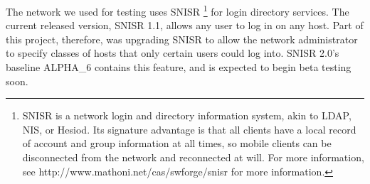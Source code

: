 The network we used for testing uses SNISR 
%
\footnote{ SNISR is a network login and directory information system, akin to
LDAP, NIS, or Hesiod.  Its signature advantage is that all clients have a
local record of account and group information at all times, so mobile clients
can be disconnected from the network and reconnected at will.  For more
information, see http://www.mathoni.net/cas/swforge/snisr for more
information. }
%
for login directory services.  
%
The current released version, SNISR 1.1, allows any user to log in on any host.  
%
Part of this project, therefore, was upgrading SNISR to allow the network
administrator to specify classes of hosts that only certain users could log
into.
%
SNISR 2.0's baseline ALPHA_6 contains this feature, and is expected to begin
beta testing soon.


